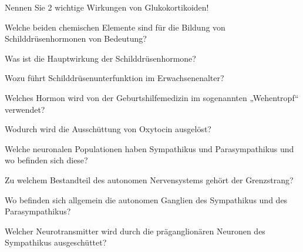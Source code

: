 \documentclass[10pt, a4paper]{exam}
\begin{document}
\begin{questions}
  \question Nennen Sie 2 wichtige Wirkungen von Glukokortikoiden!
  \begin{solution}

  \end{solution}

  \question Welche beiden chemischen Elemente sind für die Bildung von Schilddrüsenhormonen von Bedeutung?
  \begin{solution}

  \end{solution}

  \question Was ist die Hauptwirkung der Schilddrüsenhormone?
  \begin{solution}

  \end{solution}

  \question Wozu führt Schilddrüsenunterfunktion im Erwachsenenalter?
  \begin{solution}

  \end{solution}

  \question Welches Hormon wird von der Geburtshilfemedizin im sogenannten „Wehentropf“ verwendet?
  \begin{solution}

  \end{solution}

  \question Wodurch wird die Ausschüttung von Oxytocin ausgelöst?
  \begin{solution}

  \end{solution}

  \question Welche neuronalen Populationen haben Sympathikus und Parasympathikus und wo befinden sich diese?
  \begin{solution}

  \end{solution}

  \question Zu welchem Bestandteil des autonomen Nervensystems gehört der Grenzstrang?
  \begin{solution}

  \end{solution}

  \question Wo befinden sich allgemein die autonomen Ganglien des Sympathikus und des Parasympathikus?
  \begin{solution}

  \end{solution}

  \question Welcher Neurotransmitter wird durch die präganglionären Neuronen des Sympathikus ausgeschüttet?
  \begin{solution}


\end{solution}
\end{questions}
\end{document}
